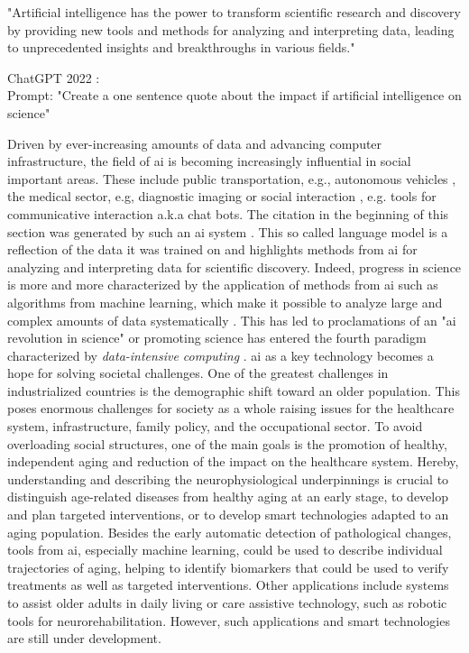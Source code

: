 \setlength{\epigraphwidth}{0.6\textwidth}
\epigraph{\centering "Artificial intelligence has the power to transform scientific research and discovery by providing new tools and methods for analyzing and interpreting data, leading to unprecedented insights and breakthroughs in various fields."} {ChatGPT 2022 \cite{Chatgpt_openai_web}:\\
Prompt: "Create a one sentence quote about the impact if artificial intelligence on science"}
 
Driven by ever-increasing amounts of data and advancing computer infrastructure, the field of \gls{ai} is becoming increasingly influential in social important areas. These include public transportation, e.g., autonomous vehicles \cite{Leonard2020}, the medical sector, e.g, diagnostic imaging \cite{Liu2020} or social interaction \cite{Adamopoulou2020}, e.g. tools for communicative interaction a.k.a chat bots. The citation in the beginning  of this section was generated by such an \gls{ai} system \cite{Chatgpt_openai_web}. This so called language model is a reflection of the data it was trained on and highlights methods from \gls{ai} for analyzing and interpreting data for scientific discovery. Indeed, progress in science is more and more characterized by the application of methods from \gls{ai} such as algorithms from machine learning, which make it possible to analyze large and complex amounts of data systematically \cite{Brunton2019}. This has led to proclamations of an "\gls{ai} revolution in science" \cite{Appenzeller2017} or promoting science has entered the fourth paradigm characterized by \textit{data-intensive computing} \cite{Hey2009}. \gls{ai} as a key technology becomes a hope for solving societal challenges. One of the greatest challenges in industrialized countries is the demographic shift toward an older population. This poses enormous challenges for society as a whole raising issues for the healthcare system, infrastructure, family policy, and the occupational sector. To avoid overloading social structures, one of the main goals is the promotion of healthy, independent aging and reduction of the impact on the healthcare system. Hereby, understanding and describing the neurophysiological underpinnings is crucial to distinguish age-related diseases from healthy aging at an early stage, to develop and plan targeted interventions, or to develop smart technologies adapted to an aging population. Besides the early automatic detection of pathological changes, tools from \gls{ai}, especially machine learning, could be used to describe individual trajectories of aging, helping to identify biomarkers that could be used to verify treatments as well as targeted interventions. Other applications include systems to assist older adults in daily living or care assistive technology, such as robotic tools for neurorehabilitation. However, such applications and smart technologies are still under development.\\
